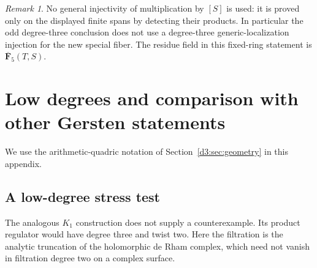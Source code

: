 \documentclass[11pt,a4paper]{amsart}
\numberwithin{equation}{section}
\theoremstyle{definition}
\theoremstyle{remark}
\newtheorem{remark}[theorem]{Remark}
\begin{document}
\begin{remark}
No general injectivity of multiplication by $[S]$ is used:
it is proved only on the displayed finite spans by detecting
their products.  In particular the odd degree-three conclusion
does not use a degree-three generic-localization injection for
the new special fiber.  The residue field in this fixed-ring
statement is $\overline{\mathbf F}_5(T,S)$.
\end{remark}




\appendix

\section{Low degrees and comparison with other Gersten statements}\label{d3:sec:comparisons}
We use the arithmetic-quadric notation of Section~\ref{d3:sec:geometry} in this appendix.

\subsection{A low-degree stress test}
The analogous $K_1$ construction does not supply a counterexample.
Its product regulator would have degree three and twist two.
Here the filtration is the analytic truncation of the holomorphic
de Rham complex, which need not vanish in filtration degree two
on a complex surface.
\end{document}
